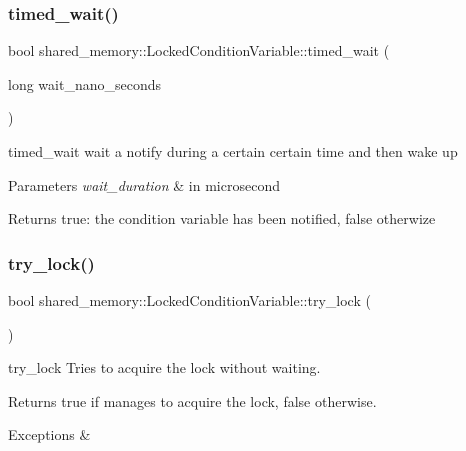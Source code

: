 \subsubsection{\texorpdfstring{timed\+\_\+wait()}{timed\_wait()}}
{\footnotesize\ttfamily bool shared\+\_\+memory\+::\+Locked\+Condition\+Variable\+::timed\+\_\+wait (\begin{DoxyParamCaption}\item[{long}]{wait\+\_\+nano\+\_\+seconds }\end{DoxyParamCaption})}



timed\+\_\+wait wait a notify during a certain certain time and then wake up 


\begin{DoxyParams}{Parameters}
{\em wait\+\_\+duration} & in microsecond \\
\hline
\end{DoxyParams}
\begin{DoxyReturn}{Returns}
true\+: the condition variable has been notified, false otherwize 
\end{DoxyReturn}
\mbox{\label{classshared__memory_1_1LockedConditionVariable_a86b42b23b94593bca5b12b9d792d1275}} 
\subsubsection{\texorpdfstring{try\+\_\+lock()}{try\_lock()}}
{\footnotesize\ttfamily bool shared\+\_\+memory\+::\+Locked\+Condition\+Variable\+::try\+\_\+lock (\begin{DoxyParamCaption}{ }\end{DoxyParamCaption})}



try\+\_\+lock Tries to acquire the lock without waiting. 

\begin{DoxyReturn}{Returns}
true if manages to acquire the lock, false otherwise. 
\end{DoxyReturn}

\begin{DoxyExceptions}{Exceptions}
{\em } & \\
\hline
\end{DoxyExceptions}
\mbox{\label{classshared__memory_1_1LockedConditionVariable_a5d28bb5942fc5bc4886014d6b9b26885}} 
